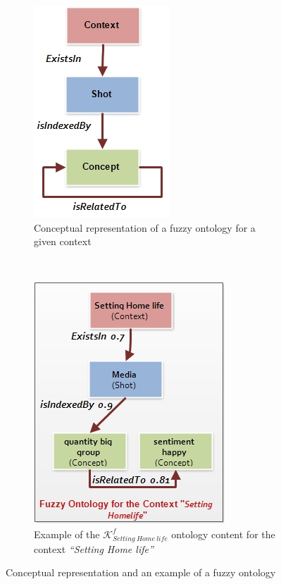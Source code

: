		\begin{figure}
			\centering
			 \begin{subfigure}[b]{0.4\textwidth}
      			  	\includegraphics[scale=1]{graphics/structure2}
       				\caption{Conceptual representation of a fuzzy ontology for a given context}
       				\label{structure}
    			\end{subfigure}
			~
			\begin{subfigure}[b]{0.4\textwidth}
      			  	\includegraphics[scale=0.9]{graphics/example}
       				\caption{Example of the $\mathcal{K}^{f}_{Setting~Home~life}$  ontology  
			content for the context \textit{``Setting Home life''}}
       				\label{structure2}
    			\end{subfigure}
			\caption{Conceptual representation and an example of a fuzzy ontology}
		\end{figure}

